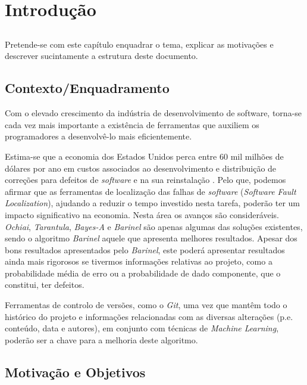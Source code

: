 \chapter{Introdução} \label{chap:intro}

\section*{}


Pretende-se com este capítulo enquadrar o tema, explicar as motivações e descrever sucintamente a estrutura deste documento.

\section{Contexto/Enquadramento} \label{sec:context}

Com o elevado crescimento da indústria de desenvolvimento de software,
torna-se cada vez mais importante a existência de ferramentas que auxiliem
os programadores a desenvolvê-lo mais eficientemente.

Estima-se que a economia dos Estados Unidos perca entre 60 mil milhões de dólares por ano em custos associados ao desenvolvimento e distribuição de correções para defeitos de \emph{software} e na sua reinstalação \cite{Zhivich2009}. Pelo que, podemos afirmar que as ferramentas de localização das falhas de \emph{software} (\emph{Software Fault Localization}), ajudando a reduzir o tempo investido nesta tarefa, poderão ter um impacto significativo na economia.
Nesta área os avanços são consideráveis. \emph{Ochiai}, \emph{Tarantula}, \emph{Bayes-A} e \emph{Barinel} são apenas algumas das soluções existentes, sendo o algoritmo \emph{Barinel} aquele que apresenta melhores resultados. \cite{Abreu2009}
Apesar dos bons resultados apresentados pelo \emph{Barinel}, este poderá apresentar resultados ainda mais rigorosos se tivermos informações relativas ao projeto, como a probabilidade média de erro ou a probabilidade de dado componente, que o constitui, ter defeitos.

Ferramentas de controlo de versões, como o \emph{Git}, uma vez que mantêm todo o histórico do projeto e informações relacionadas com as diversas alterações (p.e. conteúdo, data e autores), em conjunto com técnicas de \emph{Machine Learning}, poderão ser a chave para a melhoria deste algoritmo.

\section{Motivação e Objetivos} \label{sec:goals}


